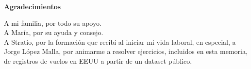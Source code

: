 \thispagestyle{empty}
\begin{titlepage}
\null
\vfill
\begin{center}
\textbf{Agradecimientos}\\
\end{center}


A mi familia, por todo su apoyo. \\

A María, por su ayuda y consejo.\\

A Stratio, por la formación que recibí al iniciar mi vida laboral, en especial, a Jorge López Malla,  por animarme a resolver ejercicios, incluidos en esta memoria, de registros de vuelos en EEUU a partir de un dataset público.\\

\vfill\null

\end{titlepage}

\thispagestyle{empty}